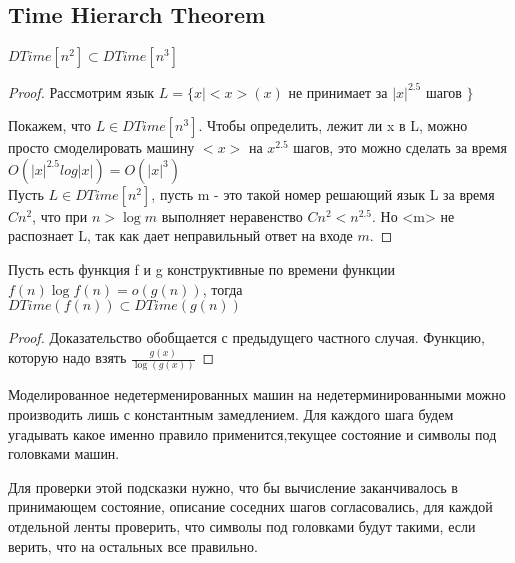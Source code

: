 \subsection{Time Hierarch Theorem}
\begin{theorem}
	$DTime[n^2] \subset DTime[n^3]$
\end{theorem}
\begin{proof}
	Рассмотрим язык $L = \{x | <x>(x)$ не принимает за $|x|^{2.5}$ шагов $\}$

	Покажем, что $L \in DTime[n^3]$. Чтобы определить, лежит ли x в L, 
	можно просто смоделировать машину $<x>$ на $x^{2.5}$ шагов, это 
	можно сделать за время $O(|x|^{2.5}log|x|) = O(|x|^{3})$\\

        Пусть $L \in DTime[n^2]$, пусть m - это такой номер решающий язык
        L за время $Cn^2$, что при $n > \log m$ выполняет неравенство $Cn^2 < n^{2.5}$.
        Но <m> не распознает L, так как дает неправильный ответ на входе $m$.
\end{proof}

\begin{theorem}
	Пусть есть функция f и g конструктивные по времени функции 
	$f(n) \log f(n) = o(g(n))$, тогда\\ 

	$DTime(f(n)) \subset DTime(g(n))$
\end{theorem}
\begin{proof}
	Доказательство обобщается с предыдущего частного случая. Функцию, которую 
	надо взять $\frac{g(x)}{\log(g(x))}$
\end{proof}

Моделированное недетерменированных машин на недетерминированными можно производить 
лишь с константным замедлением. Для каждого 
шага будем угадывать какое именно правило применится,текущее состояние и символы
под головками машин.

Для проверки этой подсказки нужно, что бы вычисление заканчивалось 
в принимающем состояние, описание соседних шагов согласовались, 
для каждой отдельной ленты проверить, что символы под головками будут такими, 
если верить, что на остальных все правильно.

